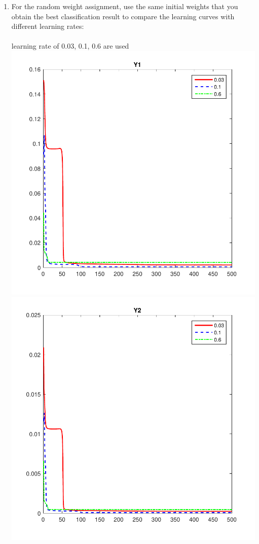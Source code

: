 \documentclass[12pt,a4paper]{article}
\begin{document}
\begin{CJK}{UTF8}{bsmi}
\begin{enumerate}
\item For the random weight assignment, use the same initial weights that you obtain the best classification result to compare the learning curves with different learning rates:
\\
\\
learning rate of 0.03, 0.1, 0.6 are used
\\
	\includegraphics[scale=0.6]{y1curve}
	\\
	\includegraphics[scale=0.6]{y2curve}

\end{enumerate}
\end{CJK}
\end{document}
